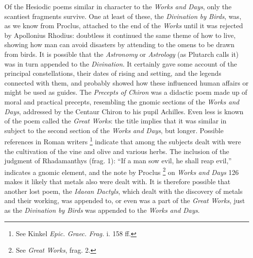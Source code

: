 Of the Hesiodic poems similar in character to the \emph{Works and Days}, only
the scantiest fragments survive. One at least of these, the \emph{Divination by
Birds}, was, as we know from Proclus, attached to the end of the
\emph{Works} until it was rejected by Apollonius Rhodius: doubtless it
continued the same theme of how to live, showing how man can avoid disasters by
attending to the omens to be drawn from birds. It is possible that the
\emph{Astronomy} or \emph{Astrology} (as Plutarch calls it) was in turn
appended to the \emph{Divination}. It certainly gave some account of the
principal constellations, their dates of rising and setting, and the legends
connected with them, and probably showed how these influenced human affairs or
might be used as guides. The \emph{Precepts of Chiron} was a didactic poem made
up of moral and practical precepts, resembling the gnomic sections of the
\emph{Works and Days}, addressed by the Centaur Chiron to his pupil Achilles.
Even less is known of the poem called the \emph{Great Works}: the title implies
that it was similar in subject to the second section of the \emph{Works and
Days}, but longer. Possible references in Roman writers \footnote{See Kinkel \emph{Epic. Graec.
Frag.} i. 158 ff.} indicate that among the subjects
dealt with were the cultivation of the vine and olive and various herbs. The
inclusion of the judgment of Rhadamanthys (frag. 1): “If a man sow evil,
he shall reap evil,” indicates a gnomic element, and the note by Proclus
\footnote{See \emph{Great Works},
frag. 2.} on \emph{Works and Days} 126
makes it likely that metals also were dealt with. It is therefore possible that
another lost poem, the \emph{Idaean Dactyls}, which dealt with the discovery of
metals and their working, was appended to, or even was a part of the \emph{Great
Works}, just as the \emph{Divination by Birds} was appended to the \emph{Works
and Days}.


